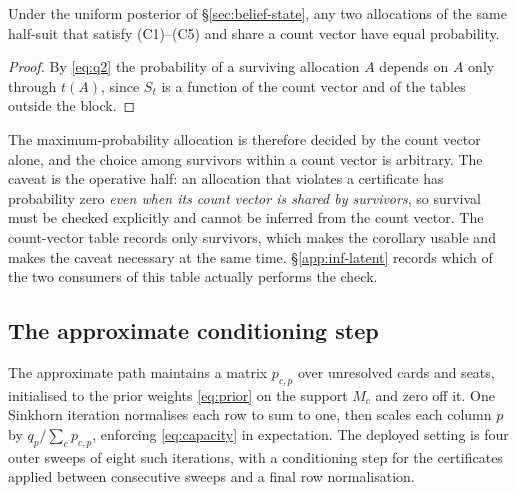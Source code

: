 \begin{corollary}
\label{cor:equalprob}
Under the uniform posterior of \S\ref{sec:belief-state}, any two allocations of
the same half-suit that satisfy (C1)--(C5) and share a count vector have equal
probability.
\end{corollary}

\begin{proof}
By \eqref{eq:q2} the probability of a surviving allocation $A$ depends on $A$ only
through $t(A)$, since $S_t$ is a function of the count vector and of the tables
outside the block.
\end{proof}

The maximum-probability allocation is therefore decided by the count vector
alone, and the choice among survivors within a count vector is arbitrary. The
caveat is the operative half: an allocation that violates a certificate has
probability zero \emph{even when its count vector is shared by survivors}, so
survival must be checked explicitly and cannot be inferred from the count vector.
The count-vector table records only survivors, which makes the corollary usable
and makes the caveat necessary at the same time. \S\ref{app:inf-latent} records
which of the two consumers of this table actually performs the check.

\subsection{The approximate conditioning step}
\label{app:inf-sinkhorn}

The approximate path maintains a matrix $p_{c,p}$ over unresolved cards and
seats, initialised to the prior weights \eqref{eq:prior} on the support $M_c$ and
zero off it. One Sinkhorn iteration normalises each row to sum to one, then
scales each column $p$ by $q_p / \sum_c p_{c,p}$, enforcing \eqref{eq:capacity}
in expectation. The deployed setting is four outer sweeps of eight such
iterations, with a conditioning step for the certificates applied between
consecutive sweeps and a final row normalisation.

